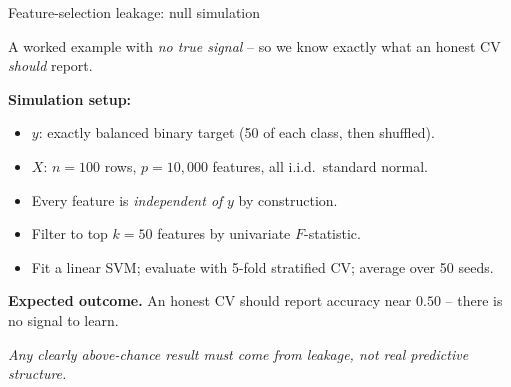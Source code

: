 \documentclass[10pt,compress,t,notes=noshow, xcolor=table]{beamer}
\begin{document}

\begin{frame}{Feature-selection leakage: null simulation}
\label{leakage-feature-selection-setup}

A worked example with \emph{no true signal} -- so we know exactly what an honest CV \emph{should} report.

\medskip

\textbf{Simulation setup:}
\begin{itemize}
  \setlength\itemsep{0.15em}
  \item $y$: exactly balanced binary target (50 of each class, then shuffled).
  \item $X$: $n = 100$ rows, $p = 10{,}000$ features, all i.i.d.\ standard normal.
  \item Every feature is \emph{independent of} $y$ by construction.
  \item Filter to top $k = 50$ features by univariate $F$-statistic.
  \item Fit a linear SVM; evaluate with 5-fold stratified CV; average over 50 seeds.
\end{itemize}

\medskip

\textbf{Expected outcome.} An honest CV should report accuracy near $\boldsymbol{0.50}$ -- there is no signal to learn.

\medskip

\centering\itshape Any clearly above-chance result must come from leakage, not real predictive structure.
\end{frame}
\end{document}
